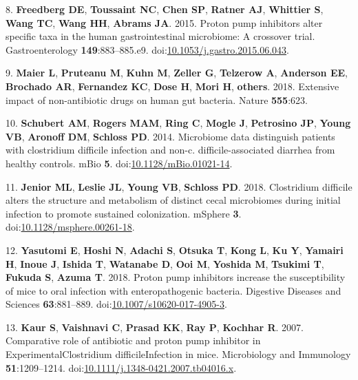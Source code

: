 \documentclass[11pt,]{article}
\begin{document}
\hypertarget{ref-Freedberg2015}{}
8. \textbf{Freedberg DE}, \textbf{Toussaint NC}, \textbf{Chen SP},
\textbf{Ratner AJ}, \textbf{Whittier S}, \textbf{Wang TC}, \textbf{Wang
HH}, \textbf{Abrams JA}. 2015. Proton pump inhibitors alter specific
taxa in the human gastrointestinal microbiome: A crossover trial.
Gastroenterology \textbf{149}:883--885.e9.
doi:\href{https://doi.org/10.1053/j.gastro.2015.06.043}{10.1053/j.gastro.2015.06.043}.

\hypertarget{ref-maier2018extensive}{}
9. \textbf{Maier L}, \textbf{Pruteanu M}, \textbf{Kuhn M},
\textbf{Zeller G}, \textbf{Telzerow A}, \textbf{Anderson EE},
\textbf{Brochado AR}, \textbf{Fernandez KC}, \textbf{Dose H},
\textbf{Mori H}, \textbf{others}. 2018. Extensive impact of
non-antibiotic drugs on human gut bacteria. Nature \textbf{555}:623.

\hypertarget{ref-Schuberte01021-14}{}
10. \textbf{Schubert AM}, \textbf{Rogers MAM}, \textbf{Ring C},
\textbf{Mogle J}, \textbf{Petrosino JP}, \textbf{Young VB},
\textbf{Aronoff DM}, \textbf{Schloss PD}. 2014. Microbiome data
distinguish patients with clostridium difficile infection and non-c.
difficile-associated diarrhea from healthy controls. mBio \textbf{5}.
doi:\href{https://doi.org/10.1128/mBio.01021-14}{10.1128/mBio.01021-14}.

\hypertarget{ref-Jenior2018}{}
11. \textbf{Jenior ML}, \textbf{Leslie JL}, \textbf{Young VB},
\textbf{Schloss PD}. 2018. Clostridium difficile alters the structure
and metabolism of distinct cecal microbiomes during initial infection to
promote sustained colonization. mSphere \textbf{3}.
doi:\href{https://doi.org/10.1128/msphere.00261-18}{10.1128/msphere.00261-18}.

\hypertarget{ref-Yasutomi2018}{}
12. \textbf{Yasutomi E}, \textbf{Hoshi N}, \textbf{Adachi S},
\textbf{Otsuka T}, \textbf{Kong L}, \textbf{Ku Y}, \textbf{Yamairi H},
\textbf{Inoue J}, \textbf{Ishida T}, \textbf{Watanabe D}, \textbf{Ooi
M}, \textbf{Yoshida M}, \textbf{Tsukimi T}, \textbf{Fukuda S},
\textbf{Azuma T}. 2018. Proton pump inhibitors increase the
susceptibility of mice to oral infection with enteropathogenic bacteria.
Digestive Diseases and Sciences \textbf{63}:881--889.
doi:\href{https://doi.org/10.1007/s10620-017-4905-3}{10.1007/s10620-017-4905-3}.

\hypertarget{ref-Kaur2007}{}
13. \textbf{Kaur S}, \textbf{Vaishnavi C}, \textbf{Prasad KK},
\textbf{Ray P}, \textbf{Kochhar R}. 2007. Comparative role of antibiotic
and proton pump inhibitor in ExperimentalClostridium difficileInfection
in mice. Microbiology and Immunology \textbf{51}:1209--1214.
doi:\href{https://doi.org/10.1111/j.1348-0421.2007.tb04016.x}{10.1111/j.1348-0421.2007.tb04016.x}.
\end{document}
